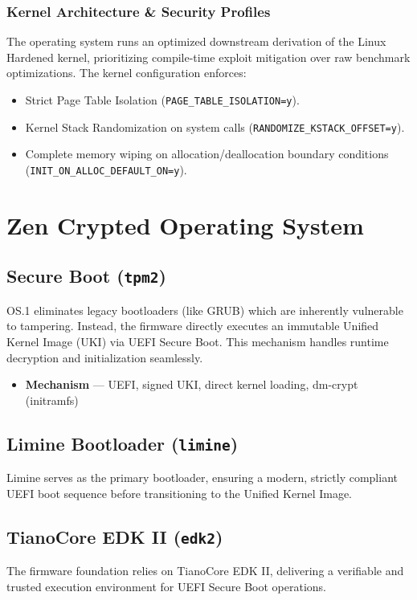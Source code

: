 \documentclass{article}
\begin{document}
\subsubsection*{Kernel Architecture \& Security Profiles}
The operating system runs an optimized downstream derivation of the Linux Hardened kernel, prioritizing compile-time exploit mitigation over raw benchmark optimizations.
The kernel configuration enforces:
\begin{itemize}
    \item Strict Page Table Isolation (\texttt{PAGE\_\allowbreak TABLE\_\allowbreak ISOLATION=y}).
    \item Kernel Stack Randomization on system calls (\texttt{RANDOMIZE\_\allowbreak KSTACK\_\allowbreak OFFSET=y}).
    \item Complete memory wiping on allocation/deallocation boundary conditions (\texttt{INIT\_\allowbreak ON\_\allowbreak ALLOC\_\allowbreak DEFAULT\_\allowbreak ON=y}).
\end{itemize}

\section{Zen Crypted Operating System}

\subsection{Secure Boot (\texttt{tpm2})}
OS.1 eliminates legacy bootloaders (like GRUB) which are inherently vulnerable to tampering. Instead, the firmware directly executes an immutable Unified Kernel Image (UKI) via UEFI Secure Boot. This mechanism handles runtime decryption and initialization seamlessly.

\begin{itemize}
    \item \textbf{Mechanism} --- UEFI, signed UKI, direct kernel loading, dm-crypt (initramfs)
\end{itemize}

\subsection{Limine Bootloader (\texttt{limine})}
Limine serves as the primary bootloader, ensuring a modern, strictly compliant UEFI boot sequence before transitioning to the Unified Kernel Image.

\subsection{TianoCore EDK II (\texttt{edk2})}
The firmware foundation relies on TianoCore EDK II, delivering a verifiable and trusted execution environment for UEFI Secure Boot operations.
\end{document}
